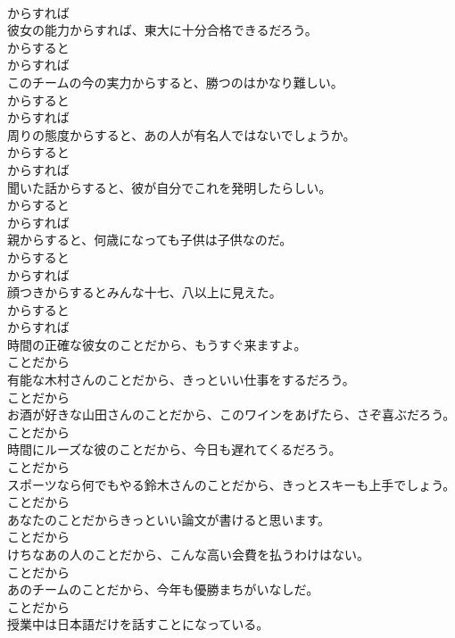 \documentclass[8pt]{extreport}
\begin{document}
\begin{CJK}{UTF8}{min}
\\	からすれば	
\\	彼女の能力からすれば、東大に十分合格できるだろう。	
\\	からすると 
\\	からすれば	
\\	このチームの今の実力からすると、勝つのはかなり難しい。	
\\	からすると 
\\	からすれば	
\\	周りの態度からすると、あの人が有名人ではないでしょうか。	
\\	からすると 
\\	からすれば	
\\	聞いた話からすると、彼が自分でこれを発明したらしい。	
\\	からすると 
\\	からすれば	
\\	親からすると、何歳になっても子供は子供なのだ。	
\\	からすると 
\\	からすれば	
\\	顔つきからするとみんな十七、八以上に見えた。	
\\	からすると 
\\	からすれば	
\\	時間の正確な彼女のことだから、もうすぐ来ますよ。	
\\	ことだから	
\\	有能な木村さんのことだから、きっといい仕事をするだろう。	
\\	ことだから	
\\	お酒が好きな山田さんのことだから、このワインをあげたら、さぞ喜ぶだろう。	
\\	ことだから	
\\	時間にルーズな彼のことだから、今日も遅れてくるだろう。	
\\	ことだから	
\\	スポーツなら何でもやる鈴木さんのことだから、きっとスキーも上手でしょう。	
\\	ことだから	
\\	あなたのことだからきっといい論文が書けると思います。	
\\	ことだから	
\\	けちなあの人のことだから、こんな高い会費を払うわけはない。	
\\	ことだから	
\\	あのチームのことだから、今年も優勝まちがいなしだ。	
\\	ことだから	
\\	授業中は日本語だけを話すことになっている。	

\end{CJK}
\end{document}
